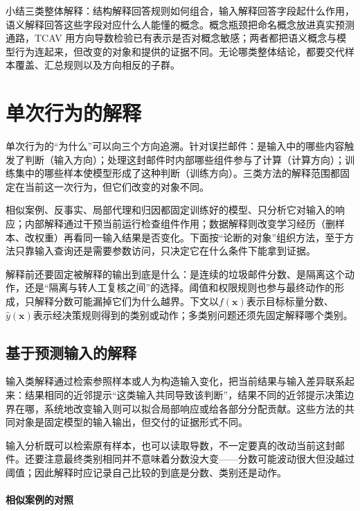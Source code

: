 小结三类整体解释：结构解释回答规则如何组合，输入解释回答字段起什么作用，语义解释回答这些字段对应什么人能懂的概念。概念瓶颈把命名概念放进真实预测通路，TCAV 用方向导数检验已有表示是否对概念敏感；两者都把语义概念与模型行为连起来，但改变的对象和提供的证据不同。无论哪类整体结论，都要交代样本覆盖、汇总规则以及方向相反的子群。

\section{单次行为的解释}
\label{sec:interpretability-local}

单次行为的“为什么”可以向三个方向追溯。针对误拦邮件：是输入中的哪些内容触发了判断（输入方向）；处理这封邮件时内部哪些组件参与了计算（计算方向）；训练集中的哪些样本使模型形成了这种判断（训练方向）。三类方法的解释范围都固定在当前这一次行为，但它们改变的对象不同。

相似案例、反事实、局部代理和归因都固定训练好的模型、只分析它对输入的响应；内部解释通过干预当前运行检查组件作用；数据解释则改变学习经历（删样本、改权重）再看同一输入结果是否变化。下面按“论断的对象”组织方法，至于方法只靠输入查询还是需要参数访问，只决定它在什么条件下能拿到证据。

解释前还要固定被解释的输出到底是什么：是连续的垃圾邮件分数、是隔离这个动作，还是“隔离与转人工复核之间”的选择。阈值和权限规则也参与最终动作的形成，只解释分数可能漏掉它们为什么越界。下文以$f(\bm x)$表示目标标量分数、$\hat y(\bm x)$表示经决策规则得到的类别或动作；多类别问题还须先固定解释哪个类别。

\subsection{基于预测输入的解释}
\label{sec:interpretability-local-input}

输入类解释通过检索参照样本或人为构造输入变化，把当前结果与输入差异联系起来：结果相同的近邻提示“这类输入共同导致该判断”，结果不同的近邻提示决策边界在哪，系统地改变输入则可以拟合局部响应或给各部分分配贡献。这些方法的共同对象是固定模型的输入输出，但交付的证据形式不同。

输入分析既可以检索原有样本，也可以读取导数，不一定要真的改动当前这封邮件。还要注意最终类别相同并不意味着分数没大变——分数可能波动很大但没越过阈值；因此解释时应记录自己比较的到底是分数、类别还是动作。

\paragraph{相似案例的对照}
\label{sec:interpretability-local-examples}

